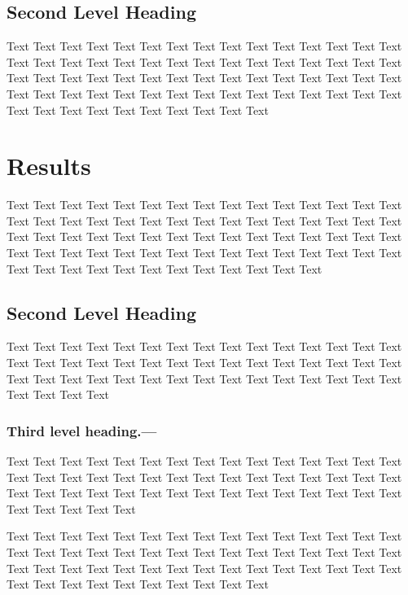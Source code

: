 \documentclass{sysbio}%
\begin{document}
\subsection{Second Level Heading}\label{sec2}

Text Text Text Text Text Text Text Text Text Text Text Text Text Text Text Text Text Text Text Text Text Text Text Text Text Text Text Text Text Text Text Text Text Text Text Text Text Text Text Text Text Text Text Text Text Text Text Text Text Text Text Text Text Text Text Text Text Text Text Text Text Text Text Text Text Text Text Text Text Text

\section{Results}\label{sec3}

Text Text Text Text Text Text Text Text Text Text Text Text Text Text Text Text Text Text Text Text Text Text Text Text Text Text Text Text Text Text Text Text Text Text Text Text Text Text Text Text Text Text Text Text Text Text Text Text Text Text Text Text Text Text Text Text Text Text Text Text Text Text Text Text Text Text Text Text Text Text Text Text%

\subsection{Second Level Heading}

Text Text Text Text Text Text Text Text Text Text Text Text Text Text Text Text Text Text Text Text Text Text Text Text Text Text Text Text Text Text Text Text Text Text Text Text Text Text Text Text Text Text Text Text Text Text Text Text Text

\subsubsection{Third level heading.---}Text Text Text Text Text Text Text Text Text Text Text Text Text Text Text Text Text Text Text Text Text Text Text Text Text Text Text Text Text Text Text Text Text Text Text Text Text Text Text Text Text Text Text Text Text Text Text Text Text Text

Text Text Text Text Text Text Text Text Text Text Text Text Text Text Text Text Text Text Text Text Text Text Text Text Text Text Text Text Text Text Text Text Text Text Text Text Text Text Text Text Text Text Text Text Text Text Text Text Text Text Text Text Text Text Text%
\end{document}
